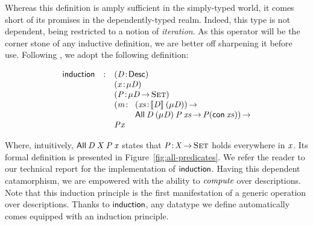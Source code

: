 Whereas this definition is amply sufficient in the simply-typed world,
it comes short of its promises in the dependently-typed realm. Indeed,
this type is not dependent, being restricted to a notion of
\emph{iteration}. As this operator will be the corner stone of any
inductive definition, we are better off sharpening it before use.
Following \citet{benke:universe-generic-prog}, we adopt the following
definition:

\[
\begin{array}{lcll}
\F{induction} & : & \multicolumn{2}{l}{\PITEL{\V{D}}{\Desc}}                   \\
              &   & \multicolumn{2}{l}{\PITEL{\V{x}}{\Mu{\V{D}}}}                   \\
              &   & \multicolumn{2}{l}{\PITEL{\V{P}}{\Mu{\V{D}} \To \Set}}         \\
              &   & \PI{\V{m}}{& \PI{\V{xs}}{\descop{\V{D}}{(\Mu{\V{D}})}}              \\
              &   &           & \All{\V{D}}{(\Mu{\V{D}})}{\V{P}}{\V{xs}} \To \V{P} (\Con{\V{xs}})} \\
              &   & \V{P} \V{x}
\end{array}
\]

Where, intuitively, $\All{\V{D}}{\V{X}}{\V{P}}{\V{x}}$ states that
$\Bhab{\V{P}}{\V{X} \To \Set}$ holds everywhere in $\V{x}$. Its formal
definition is presented in Figure~\ref{fig:all-predicates}.  We refer
the reader to our technical report for the implementation of
$\F{induction}$. Having this dependent catamorphism, we are empowered
with the ability to $\emph{compute}$ over descriptions. Note that this
induction principle is the first manifestation of a generic operation
over descriptions. Thanks to $\F{induction}$, any datatype we define
automatically comes equipped with an induction principle.


